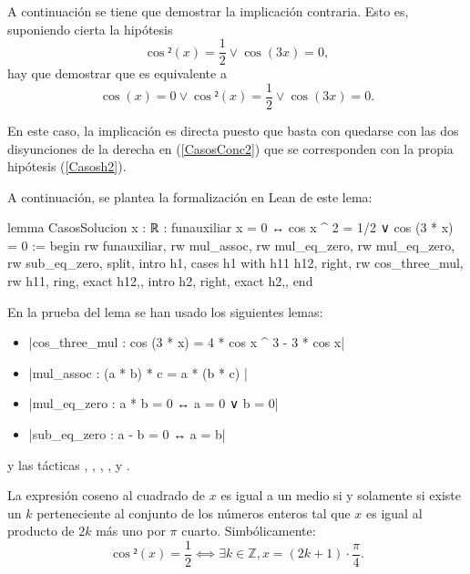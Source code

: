 \begin{demostracion}
  \noindent
  \framebox{\longleftarrow} A continuación se tiene que demostrar
  la implicación contraria. Esto es, suponiendo cierta la
  hipótesis
  \begin{equation}\label{Casosh2}\tag{h2}
    \cos²(x)=\frac{1}{2} \lor \cos(3x)=0,
  \end{equation}
  hay que demostrar que es equivalente a
  \begin{equation}\label{CasosConc2}
    \cos(x)=0 \lor \cos²(x)=\frac{1}{2}\lor \cos(3x)=0.
  \end{equation}

  En este caso, la implicación es directa puesto que basta con
  quedarse con las dos disyunciones de la derecha en
  (\ref{CasosConc2}) que se corresponden con la propia hipótesis
  (\ref{Casosh2}).
\end{demostracion}

A continuación, se plantea la formalización en Lean de este lema:
\begin{leancode}
lemma CasosSolucion
  {x : ℝ}
  : funauxiliar x = 0 ↔ cos x ^ 2 = 1/2 ∨ cos (3 * x) = 0 :=
begin
  rw funauxiliar,
  rw mul_assoc,
  rw mul_eq_zero,
  rw mul_eq_zero,
  rw sub_eq_zero,
  split,
  { intro h1,
    cases h1 with h11 h12,
    right,
    rw cos_three_mul,
    rw h11,
    ring,
    exact h12,},
  { intro h2,
    right,
    exact h2,},
end
\end{leancode}

En la prueba del lema se han usado los siguientes lemas:
\begin{itemize}
\item {}|cos_three_mul : cos (3 * x) = 4 * cos x ^ 3 - 3 * cos x|
\item {}|mul_assoc : (a * b) * c = a * (b * c) |
\item {}|mul_eq_zero : a * b = 0 ↔ a = 0 ∨ b = 0|
\item {}|sub_eq_zero : a - b = 0 ↔ a = b|
\end{itemize}
y las tácticas
,
,
,
,
 y
.

\begin{lema}[SolucionCosenoCuadrado]\label{lemaCosenoCuadrado}
  La expresión coseno al cuadrado de \(x\) es igual a un medio si y
  solamente si existe un \(k\) perteneciente al conjunto de los números
  enteros tal que \(x\) es igual al producto de \(2k\) más uno por \(π\)
  cuarto. Simbólicamente:
  \begin{equation}\label{problema2}
    \cos²(x) = \frac{1}{2} ⟺ ∃ k ∈ ℤ, x = (2k+1)⋅\frac{π}{4}.
  \end{equation}
\end{lema}

